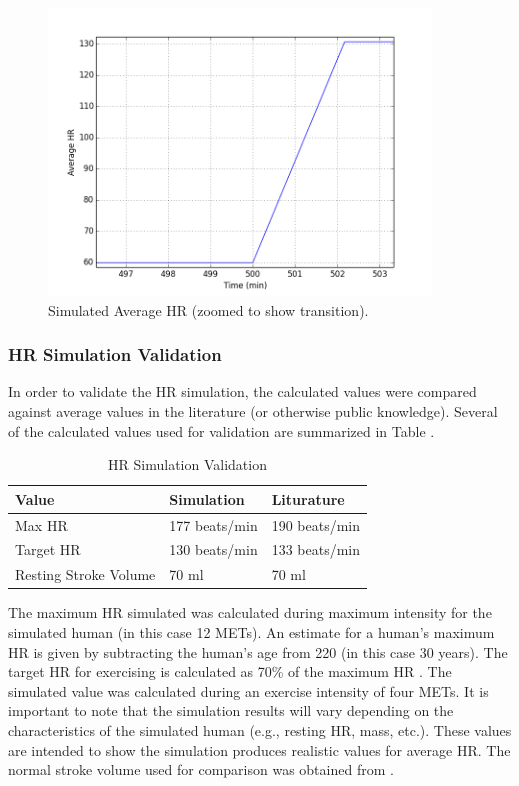 \documentclass[paper=a4, fontsize=11pt]{scrartcl}
\numberwithin{equation}{section}		%
\numberwithin{figure}{section}			%
\numberwithin{table}{section}		    %
\begin{document}
\begin{figure}[H]
	\begin{center} 
		\includegraphics[height=3in,width=4in]{avg_hr_zoomed} 
		\caption{Simulated Average HR (zoomed to show transition). \label{fig:hr_zoom}} 
	\end{center} 
\end{figure}

\subsubsection{HR Simulation Validation}
In order to validate the HR simulation, the calculated values were compared against average values
in the literature (or otherwise public knowledge). Several of the calculated values used for 
validation are summarized in Table .

\begin{table}[H]
	\centering
	\caption{HR Simulation Validation}
	\label{tbl:hr_valid}
	\begin{tabular}{lll}
		\hline
		\textbf{Value}        & \textbf{Simulation} & \textbf{Liturature} \\ \hline
		Max HR                & 177 beats/min       & 190 beats/min       \\
		Target HR             & 130 beats/min       & 133 beats/min       \\
		Resting Stroke Volume & 70 ml               & 70 ml              \\ \hline
	\end{tabular}
\end{table}

The maximum HR simulated was calculated during maximum intensity for the simulated human (in this 
case 12 METs). An estimate for a human's maximum HR is given by subtracting the human's age
from 220 \cite{mayo2014exercise} (in this case 30 years). The target HR for exercising is calculated 
as 70\% of the maximum HR \cite{mayo2014exercise}. The simulated value was calculated during an
exercise intensity of four METs. It is important to note that the simulation results will vary 
depending on the characteristics of the simulated human (e.g., resting HR, mass, etc.). These
values are intended to show the simulation produces realistic values for average HR.
The normal stroke volume used for comparison was obtained from \cite{klabunde1015regulation}.
\end{document}
